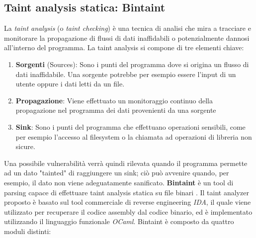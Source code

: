\documentclass[../main.tex]{subfiles}
\begin{document}
\subsection{Taint analysis statica: Bintaint}
La \textit{taint analysis} (o \textit{taint checking}) è una tecnica di analisi che mira a tracciare e monitorare la propagazione di flussi di dati inaffidabili o 
potenzialmente dannosi all'interno del programma. La taint analysis si compone di tre elementi chiave:
\begin{enumerate}
    \item \textbf{Sorgenti} (Sources): Sono i punti del programma dove si origina un flusso di dati inaffidabile. Una sorgente potrebbe per esempio essere l'input di un utente oppure i dati
    letti da un file.
    \item \textbf{Propagazione}: Viene effettuato un monitoraggio continuo della propagazione nel programma dei dati provenienti da una sorgente
    \item \textbf{Sink}: Sono i punti del programma che effettuano operazioni sensibili, come per esempio l'accesso al filesystem o la chiamata ad operazioni di libreria non sicure. 
\end{enumerate}
Una possibile vulnerabilità verrà quindi rilevata quando il programma permette ad un dato "tainted" di raggiungere un sink; ciò può avvenire quando, per esempio, il dato
non viene adeguatamente sanificato.
\newline
\textbf{Bintaint} è un tool di parsing capace di effettuare taint analysis statica su file binari  \cite{Bintaint}.
Il taint analyzer proposto è basato sul tool commerciale di reverse engineering \textit{IDA}, il quale viene utilizzato per recuperare il codice assembly dal codice binario, 
ed è implementato utilizzando il linguaggio funzionale \textit{OCaml}.
Bintaint è composto da quattro moduli distinti:
\end{document}
